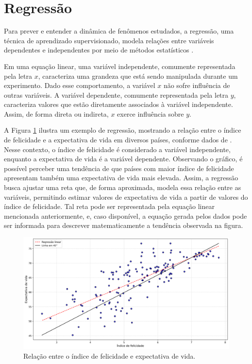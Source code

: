 \section{Regressão}
\label{sec:regressao}

Para prever e entender a dinâmica de fenômenos estudados, a regressão, uma técnica de aprendizado supervisionado, modela relações entre variáveis dependentes e independentes por meio de métodos estatísticos \cite{soto2013}.

Em uma equação linear, uma variável independente, comumente representada pela letra $x$, caracteriza uma grandeza que está sendo manipulada durante um experimento. Dado esse comportamento, a variável $x$ não sofre influência de outras variáveis. A variável dependente, comumente representada pela letra $y$, caracteriza valores que estão diretamente associados à variável independente. Assim, de forma direta ou indireta, $x$ exerce influência sobre $y$.

A Figura \ref{fig:regressao_exemplo} ilustra um exemplo de regressão, mostrando a relação entre o índice de felicidade e a expectativa de vida em diversos países, conforme dados de \cite{helliwell2020}. Nesse contexto, o índice de felicidade é considerado a variável independente, enquanto a expectativa de vida é a variável dependente. Observando o gráfico, é possível perceber uma tendência de que países com maior índice de felicidade apresentam também uma expectativa de vida mais elevada. Assim, a regressão busca ajustar uma reta que, de forma aproximada, modela essa relação entre as variáveis, permitindo estimar valores de expectativa de vida a partir de valores do índice de felicidade. Tal reta pode ser representada pela equação linear mencionada anteriormente, e, caso disponível, a equação gerada pelos dados pode ser informada para descrever matematicamente a tendência observada na figura.

\begin{figure}[H]
	\caption{\label{fig:regressao_exemplo}Relação entre o índice de felicidade e expectativa de vida.}
	\begin{center}
		\includegraphics[scale=0.4]{figuras/happiness_world.png}
	\end{center}
\end{figure}

